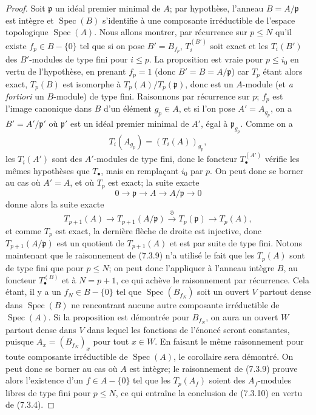 \begin{proof}
Soit $\mathfrak p$ un idéal premier minimal de $A$; par hypothèse, l'anneau
$B=A/\mathfrak p$ est intègre et $\operatorname{Spec}(B)$ s'identifie à une
composante irréductible de l'espace topologique $\operatorname{Spec}(A)$. Nous
allons montrer, par récurrence sur $p\leq N$ qu'il existe
$f_p\in B-\{0\}$ tel que si on pose $B'=B_{f_p}$, $T_i^{(B')}$ soit exact et
les $T_i(B')$ des $B'$-modules de type fini pour $i\leq p$. La proposition est
vraie pour $p\leq i_0$ en vertu de l'hypothèse, en prenant $f_p=1$ (donc
$B'=B=A/\mathfrak p$) car $T_p$ étant alors exact, $T_p(B)$ est isomorphe à
$T_p(A)/T_p(\mathfrak p)$, donc est un $A$-module (et \emph{a fortiori} un
$B$-module) de type fini. Raisonnons par récurrence sur $p$; $f_p$ est l'image
canonique dans $B$ d'un élément $g_p\in A$, et si l'on pose $A'=A_{g_p}$, on a
$B'=A'/\mathfrak p'$ où $\mathfrak p'$ est un idéal premier minimal de $A'$,
égal à $\mathfrak p_{g_p}$. Comme on a
\[
  T_i(A_{g_p})=(T_i(A))_{g_p},
\]
les $T_i(A')$ sont des $A'$-modules de type fini, donc le foncteur
$T_\bullet^{(A')}$ vérifie les mêmes hypothèses que $T_\bullet$, mais en
remplaçant $i_0$ par $p$. On peut donc se borner au cas où $A'=A$, et où $T_p$
est exact; la suite exacte
\[
  0\longrightarrow\mathfrak p\longrightarrow A\longrightarrow A/\mathfrak p
  \longrightarrow0
\]
donne alors la suite exacte
\[
  T_{p+1}(A)\longrightarrow T_{p+1}(A/\mathfrak p)
  \xrightarrow{\partial}T_p(\mathfrak p)\longrightarrow T_p(A),
\]
et comme $T_p$ est exact, la dernière flèche de droite est injective, donc
$T_{p+1}(A/\mathfrak p)$ est un quotient de $T_{p+1}(A)$ et est par suite de
type fini. Notons maintenant que le raisonnement de (7.3.9) n'a utilisé le fait
que les $T_p(A)$ sont de type fini que pour $p\leq N$; on peut donc l'appliquer
à l'anneau intègre $B$, au foncteur $T_\bullet^{(B)}$ et à $N=p+1$, ce qui
achève le raisonnement par récurrence. Cela étant, il y a un
$f_N\in B-\{0\}$ tel que $\operatorname{Spec}(B_{f_N})$ soit un ouvert $V$
partout dense dans $\operatorname{Spec}(B)$ ne rencontrant aucune autre
composante irréductible de $\operatorname{Spec}(A)$. Si la proposition est
démontrée pour $B_{f_N}$, on aura un ouvert $W$ partout dense dans $V$ dans
lequel les fonctions de l'énoncé seront constantes, puisque
$A_x=(B_{f_N})_x$ pour tout $x\in W$. En faisant le même raisonnement pour
toute composante irréductible de $\operatorname{Spec}(A)$, le corollaire sera
démontré. On peut donc se borner au cas où $A$ est intègre; le raisonnement de
(7.3.9) prouve alors l'existence d'un $f\in A-\{0\}$ tel que les $T_p(A_f)$
soient des $A_f$-modules libres de type fini pour $p\leq N$, ce qui entraîne
la conclusion de (7.3.10) en vertu de (7.3.4).
\end{proof}

